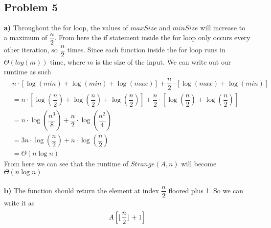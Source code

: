 \documentclass[12pt]{article}
\DeclarePairedDelimiter\floor{\lfloor}{\rfloor}
\begin{document}
\subsection*{Problem 5}
\textbf{a)} Throughout the for loop, the values of $maxSize$ and $minSize$ will increase to a maximum of $\dfrac{n}{2}$. From here the if statement inside the for loop only occurs every other iteration, so $\dfrac{n}{2}$ times. Since each function inside the for loop runs in $\Theta(log(m))$ time, where $m$ is the size of the input. We can write out our runtime as such
\begin{align*}
&n \cdot [\log(min) + \log(min) + \log(max)] + \dfrac{n}{2} \cdot [\log(max) + \log(min)]\\
&= n \cdot [\log(\dfrac{n}{2}) + \log(\dfrac{n}{2}) + \log(\dfrac{n}{2})] + \dfrac{n}{2} \cdot [\log(\dfrac{n}{2}) + \log(\dfrac{n}{2})]\\
&= n \cdot \log(\dfrac{n^{3}}{8}) + \dfrac{n}{2} \cdot \log(\dfrac{n^{2}}{4})\\
&= 3n \cdot \log(\dfrac{n}{2}) + n \cdot \log(\dfrac{n}{2})\\
&= \Theta(n \log n)
\end{align*}
From here we can see that the runtime of $Strange(A, n)$ will become $\Theta(n \log n)$\\\\
\textbf{b)} The function should return the element at index $\dfrac{n}{2}$ floored plus 1. So we can write it as
\[ A\left[ \floor{\dfrac{n}{2}} + 1\right] \]
\end{document}
